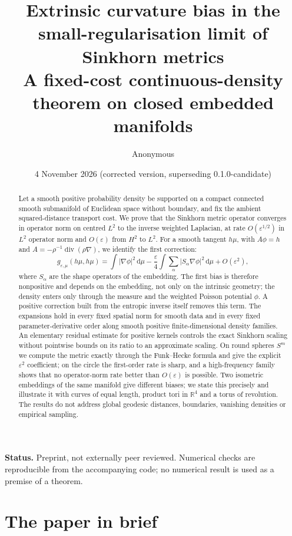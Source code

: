 \documentclass[11pt,a4paper]{article}
\title{Extrinsic curvature bias in the small-regularisation limit of Sinkhorn metrics\\[4pt]\large A fixed-cost continuous-density theorem on closed embedded manifolds}
\author{Anonymous}
\date{4 November 2026 (corrected version, superseding 0.1.0-candidate)}
\theoremstyle{definition}\newtheorem{definition}[theorem]{Definition}
\theoremstyle{remark}\newtheorem{remark}[theorem]{Remark}
\newcommand{\eps}{\varepsilon}
\newcommand{\dd}{\,\mathrm d}
\newcommand{\R}{\mathbb R}
\newcommand{\diver}{\operatorname{div}}
\begin{document}
\maketitle
\begin{abstract}
Let a smooth positive probability density be supported on a compact connected smooth submanifold of Euclidean space without boundary, and fix the ambient squared-distance transport cost. We prove that the Sinkhorn metric operator converges in operator norm on centred $L^2$ to the inverse weighted Laplacian, at rate $O(\eps^{1/2})$ in $L^2$ operator norm and $O(\eps)$ from $H^2$ to $L^2$. For a smooth tangent $h\mu$, with $A\phi=h$ and $A=-\rho^{-1}\diver(\rho\nabla)$, we identify the first correction:
\[
g_{\eps,\mu}(h\mu,h\mu)=\int|\nabla\phi|^2\dd\mu
-\frac{\eps}{4}\int\sum_\alpha|S_\alpha\nabla\phi|^2\dd\mu+O(\eps^2),
\]
where $S_\alpha$ are the shape operators of the embedding. The first bias is therefore nonpositive and depends on the embedding, not only on the intrinsic geometry; the density enters only through the measure and the weighted Poisson potential $\phi$. A positive correction built from the entropic inverse itself removes this term. The expansions hold in every fixed spatial norm for smooth data and in every fixed parameter-derivative order along smooth positive finite-dimensional density families. An elementary residual estimate for positive kernels controls the exact Sinkhorn scaling without pointwise bounds on its ratio to an approximate scaling. On round spheres $S^m$ we compute the metric exactly through the Funk--Hecke formula and give the explicit $\eps^2$ coefficient; on the circle the first-order rate is sharp, and a high-frequency family shows that no operator-norm rate better than $O(\eps)$ is possible. Two isometric embeddings of the same manifold give different biases; we state this precisely and illustrate it with curves of equal length, product tori in $\R^4$ and a torus of revolution. The results do not address global geodesic distances, boundaries, vanishing densities or empirical sampling.
\end{abstract}
\noindent\textbf{Status.} Preprint, not externally peer reviewed. Numerical checks are reproducible from the accompanying code; no numerical result is used as a premise of a theorem.

\section*{The paper in brief}
\end{document}
